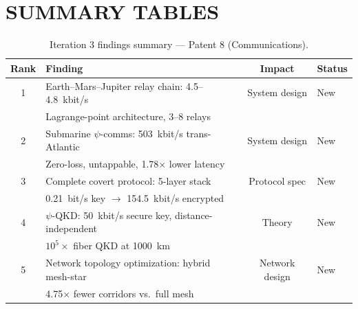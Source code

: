 \documentclass[aps,prd,twocolumn,superscriptaddress,nofootinbib]{revtex4-2}
\begin{document}
\section{SUMMARY TABLES}
\label{sec:summary}

\begin{table}[t]
\caption{Iteration 3 findings summary --- Patent 8 (Communications).}
\begin{ruledtabular}
\begin{tabular}{clcl}
Rank & Finding & Impact & Status \\
\hline
1 & Earth--Mars--Jupiter relay chain: 4.5--4.8~kbit/s & System design &
New \\
  & Lagrange-point architecture, 3--8 relays & & \\
2 & Submarine $\psi$-comms: 503~kbit/s trans-Atlantic & System design &
New \\
  & Zero-loss, untappable, 1.78$\times$ lower latency & & \\
3 & Complete covert protocol: 5-layer stack & Protocol spec &
New \\
  & 0.21~bit/s key $\to$ 154.5~kbit/s encrypted & & \\
4 & $\psi$-QKD: 50~kbit/s secure key, distance-independent & Theory &
New \\
  & $10^5\times$ fiber QKD at 1000~km & & \\
5 & Network topology optimization: hybrid mesh-star & Network design &
New \\
  & 4.75$\times$ fewer corridors vs.\ full mesh & & \\
\end{tabular}
\end{ruledtabular}
\end{table}
\end{document}
